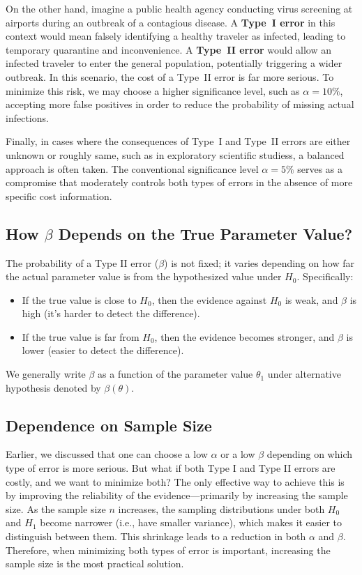 \documentclass[twoside]{book}
\begin{document}
On the other hand, imagine a public health agency conducting virus screening at airports during an outbreak of a contagious disease. A \textbf{Type~I error} in this context would mean falsely identifying a healthy traveler as infected, leading to temporary quarantine and inconvenience. A \textbf{Type~II error} would allow an infected traveler to enter the general population, potentially triggering a wider outbreak. In this scenario, the cost of a Type~II error is far more serious. To minimize this risk, we may choose a higher significance level, such as $\alpha = 10\%$, accepting more false positives in order to reduce the probability of missing actual infections.

Finally, in cases where the consequences of Type~I and Type~II errors are either unknown or roughly same, such as in exploratory scientific studiess, a balanced approach is often taken. The conventional significance level $\alpha = 5\%$ serves as a compromise that moderately controls both types of errors in the absence of more specific cost information.

\subsection{How $\beta$ Depends on the True Parameter Value?}
The probability of a Type II error ($\beta$) is not fixed; it varies depending on how far the actual parameter value is from the hypothesized value under $H_0$. Specifically:

\begin{itemize}
	\item If the true value is close to $H_0$, then the evidence against $H_0$ is weak, and $\beta$ is high (it’s harder to detect the difference).

	\item If the true value is far from $H_0$, then the evidence becomes stronger, and $\beta$ is lower (easier to detect the difference).
\end{itemize}
We generally write $\beta$ as a function of the parameter value $\theta_1$ under alternative hypothesis denoted by $\beta(\theta)$.

\subsection{Dependence on Sample Size}
Earlier, we discussed that one can choose a low $\alpha$ or a low $\beta$ depending on which type of error is more serious. But what if both Type I and Type II errors are costly, and we want to minimize both? The only effective way to achieve this is by improving the reliability of the evidence—primarily by increasing the sample size. As the sample size $n$ increases, the sampling distributions under both $H_0$ and $H_1$ become narrower (i.e., have smaller variance), which makes it easier to distinguish between them. This shrinkage leads to a reduction in both $\alpha$ and $\beta$. Therefore, when minimizing both types of error is important, increasing the sample size is the most practical solution.
\end{document}
